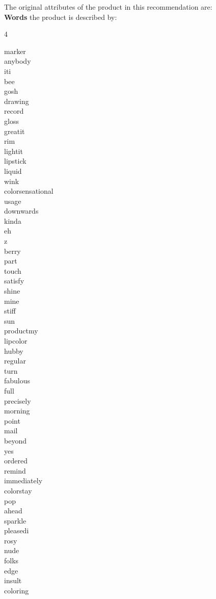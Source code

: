 The original attributes of the product in this recommendation are:\\
\noindent \textbf{Words} the product is described by:
\begin{multicols}{4}
	\raggedright marker\\ anybody\\ iti\\ bee\\ gosh\\ drawing\\ record\\ gloss\\ greatit\\
	rim\\ lightit\\ lipstick\\ liquid\\ wink\\ colorsensational\\ usage\\ downwards\\
	kinda\\ eh\\ z\\ berry\\ part\\ touch\\ satisfy\\ shine\\ mine\\ stiff\\ sun\\
	productmy\\ lipcolor\\ hubby\\ regular\\ turn\\ fabulous\\ full\\ precisely\\ morning\\
	point\\ mail\\ beyond\\ yes\\ ordered\\ remind\\ immediately\\ colorstay\\ pop\\
	ahead\\ sparkle\\ pleasedi\\ rosy\\ nude\\ folks\\ edge\\ insult\\ coloring\\

\end{multicols}
